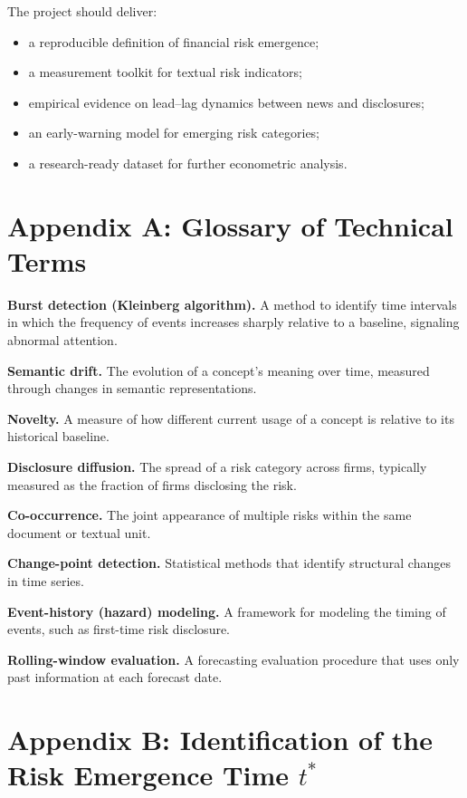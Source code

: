 \documentclass[11pt,a4paper]{article}
\begin{document}
The project should deliver:
\begin{itemize}
\item a reproducible definition of financial risk emergence;
\item a measurement toolkit for textual risk indicators;
\item empirical evidence on lead--lag dynamics between news and disclosures;
\item an early-warning model for emerging risk categories;
\item a research-ready dataset for further econometric analysis.
\end{itemize}

\newpage
\appendix

\section{Appendix A: Glossary of Technical Terms}

\textbf{Burst detection (Kleinberg algorithm).} A method to identify time intervals in which the frequency of events increases sharply relative to a baseline, signaling abnormal attention.

\textbf{Semantic drift.} The evolution of a concept’s meaning over time, measured through changes in semantic representations.

\textbf{Novelty.} A measure of how different current usage of a concept is relative to its historical baseline.

\textbf{Disclosure diffusion.} The spread of a risk category across firms, typically measured as the fraction of firms disclosing the risk.

\textbf{Co-occurrence.} The joint appearance of multiple risks within the same document or textual unit.

\textbf{Change-point detection.} Statistical methods that identify structural changes in time series.

\textbf{Event-history (hazard) modeling.} A framework for modeling the timing of events, such as first-time risk disclosure.

\textbf{Rolling-window evaluation.} A forecasting evaluation procedure that uses only past information at each forecast date.

\section{Appendix B: Identification of the Risk Emergence Time $t^*$}
\end{document}
